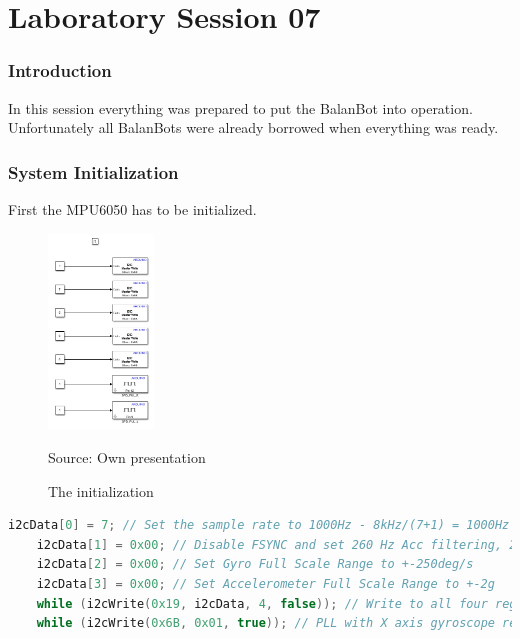 \part{Laboratory Session 07}
\section{Introduction}
In this session everything was prepared to put the BalanBot into operation. Unfortunately all BalanBots were already borrowed when everything was ready.

\section{System Initialization}
First the MPU6050 has to be initialized.

	\begin{figure}[H]
		\centering
		\includegraphics[width=0.25\textwidth]{figures/init.PNG}
		\caption{The initialization}	
		Source: Own presentation	
		\label{fig:init}	
	\end{figure}

	\begin{mdframed}
		\begin{lstlisting}[caption={C-Code from the script}, language=c,label={lst:init}]
	i2cData[0] = 7; // Set the sample rate to 1000Hz - 8kHz/(7+1) = 1000Hz
	i2cData[1] = 0x00; // Disable FSYNC and set 260 Hz Acc filtering, 256 Hz Gyro filtering, 8 KHz sampling
	i2cData[2] = 0x00; // Set Gyro Full Scale Range to +-250deg/s
	i2cData[3] = 0x00; // Set Accelerometer Full Scale Range to +-2g
	while (i2cWrite(0x19, i2cData, 4, false)); // Write to all four registers at once
	while (i2cWrite(0x6B, 0x01, true)); // PLL with X axis gyroscope reference and disable sleep mode		
		\end{lstlisting}
	\end{mdframed}
	

